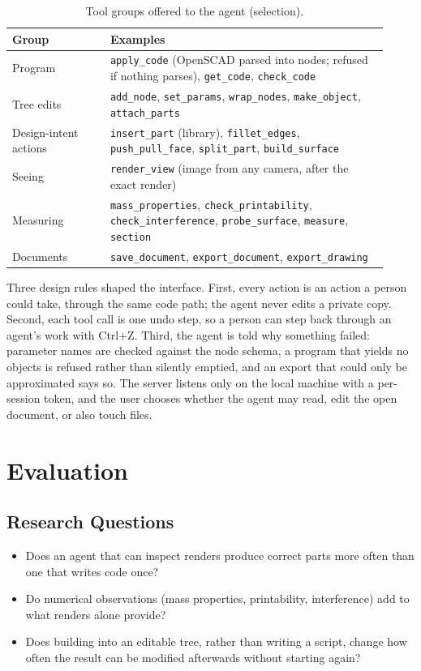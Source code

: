\documentclass[lineno]{asmejour}
\begin{document}
\begin{table}[t]
\caption{Tool groups offered to the agent (selection).}
\label{tab:tools}
\centering\small
\begin{tabular}{p{0.24\linewidth}p{0.68\linewidth}}
\toprule
Group & Examples \\
\midrule
Program & \texttt{apply\_code} (OpenSCAD parsed into nodes; refused if nothing parses), \texttt{get\_code}, \texttt{check\_code} \\
Tree edits & \texttt{add\_node}, \texttt{set\_params}, \texttt{wrap\_nodes}, \texttt{make\_object}, \texttt{attach\_parts} \\
Design-intent actions & \texttt{insert\_part} (library), \texttt{fillet\_edges}, \texttt{push\_pull\_face}, \texttt{split\_part}, \texttt{build\_surface} \\
Seeing & \texttt{render\_view} (image from any camera, after the exact render) \\
Measuring & \texttt{mass\_properties}, \texttt{check\_printability}, \texttt{check\_interference}, \texttt{probe\_surface}, \texttt{measure}, \texttt{section} \\
Documents & \texttt{save\_document}, \texttt{export\_document}, \texttt{export\_drawing} \\
\bottomrule
\end{tabular}
\end{table}

Three design rules shaped the interface. First, every action is an action a person could take, through the same code path; the agent never edits a private copy. Second, each tool call is one undo step, so a person can step back through an agent's work with Ctrl+Z. Third, the agent is told why something failed: parameter names are checked against the node schema, a program that yields no objects is refused rather than silently emptied, and an export that could only be approximated says so. The server listens only on the local machine with a per-session token, and the user chooses whether the agent may read, edit the open document, or also touch files.

\section{Evaluation}

\subsection{Research Questions}
\begin{itemize}
\item[RQ1] Does an agent that can inspect renders produce correct parts more often than one that writes code once?
\item[RQ2] Do numerical observations (mass properties, printability, interference) add to what renders alone provide?
\item[RQ3] Does building into an editable tree, rather than writing a script, change how often the result can be modified afterwards without starting again?
\end{itemize}
\end{document}
